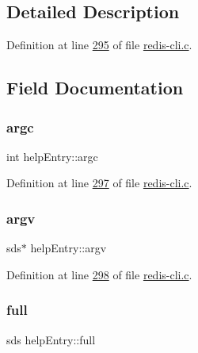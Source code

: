\subsection{Detailed Description}


Definition at line \hyperlink{redis-cli_8c_source_l00295}{295} of file \hyperlink{redis-cli_8c_source}{redis-\/cli.\+c}.



\subsection{Field Documentation}
\mbox{\label{structhelpEntry_ad62205ba643b74c6cd45ebaf9963e72c}} 
\subsubsection{\texorpdfstring{argc}{argc}}
{\footnotesize\ttfamily int help\+Entry\+::argc}



Definition at line \hyperlink{redis-cli_8c_source_l00297}{297} of file \hyperlink{redis-cli_8c_source}{redis-\/cli.\+c}.

\mbox{\label{structhelpEntry_acccc8bea30c611a6e5b20aece3961556}} 
\subsubsection{\texorpdfstring{argv}{argv}}
{\footnotesize\ttfamily sds$\ast$ help\+Entry\+::argv}



Definition at line \hyperlink{redis-cli_8c_source_l00298}{298} of file \hyperlink{redis-cli_8c_source}{redis-\/cli.\+c}.

\mbox{\label{structhelpEntry_aac5638903c052c507e9c138e8093ef68}} 
\subsubsection{\texorpdfstring{full}{full}}
{\footnotesize\ttfamily sds help\+Entry\+::full}



